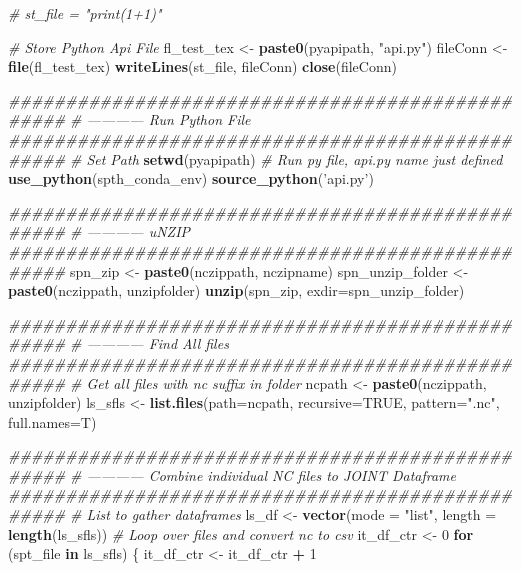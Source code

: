\documentclass[
]{book}
\newenvironment{Shaded}{\begin{snugshade}}{\end{snugshade}}
\newcommand{\CommentTok}[1]{\textcolor[rgb]{0.56,0.35,0.01}{\textit{#1}}}
\newcommand{\ControlFlowTok}[1]{\textcolor[rgb]{0.13,0.29,0.53}{\textbf{#1}}}
\newcommand{\DataTypeTok}[1]{\textcolor[rgb]{0.13,0.29,0.53}{#1}}
\newcommand{\DecValTok}[1]{\textcolor[rgb]{0.00,0.00,0.81}{#1}}
\newcommand{\KeywordTok}[1]{\textcolor[rgb]{0.13,0.29,0.53}{\textbf{#1}}}
\newcommand{\NormalTok}[1]{#1}
\newcommand{\OperatorTok}[1]{\textcolor[rgb]{0.81,0.36,0.00}{\textbf{#1}}}
\newcommand{\OtherTok}[1]{\textcolor[rgb]{0.56,0.35,0.01}{#1}}
\newcommand{\StringTok}[1]{\textcolor[rgb]{0.31,0.60,0.02}{#1}}
\begin{document}
\begin{Shaded}
\begin{Highlighting}[]
    \CommentTok{# st_file = "print(1+1)"}

    \CommentTok{# Store Python Api File}
\NormalTok{    fl_test_tex <-}\StringTok{ }\KeywordTok{paste0}\NormalTok{(pyapipath, }\StringTok{"api.py"}\NormalTok{)}
\NormalTok{    fileConn <-}\StringTok{ }\KeywordTok{file}\NormalTok{(fl_test_tex)}
    \KeywordTok{writeLines}\NormalTok{(st_file, fileConn)}
    \KeywordTok{close}\NormalTok{(fileConn)}

    \CommentTok{#################################################}
    \CommentTok{# ------------ Run Python File}
    \CommentTok{#################################################}
    \CommentTok{# Set Path}
    \KeywordTok{setwd}\NormalTok{(pyapipath)}
    \CommentTok{# Run py file, api.py name just defined}
    \KeywordTok{use_python}\NormalTok{(spth_conda_env)}
    \KeywordTok{source_python}\NormalTok{(}\StringTok{'api.py'}\NormalTok{)}

    \CommentTok{#################################################}
    \CommentTok{# ------------ uNZIP}
    \CommentTok{#################################################}
\NormalTok{    spn_zip <-}\StringTok{ }\KeywordTok{paste0}\NormalTok{(nczippath, nczipname)}
\NormalTok{    spn_unzip_folder <-}\StringTok{ }\KeywordTok{paste0}\NormalTok{(nczippath, unzipfolder)}
    \KeywordTok{unzip}\NormalTok{(spn_zip, }\DataTypeTok{exdir=}\NormalTok{spn_unzip_folder)}

    \CommentTok{#################################################}
    \CommentTok{# ------------ Find All files}
    \CommentTok{#################################################}
    \CommentTok{# Get all files with nc suffix in folder}
\NormalTok{    ncpath <-}\StringTok{ }\KeywordTok{paste0}\NormalTok{(nczippath, unzipfolder)}
\NormalTok{    ls_sfls <-}\StringTok{ }\KeywordTok{list.files}\NormalTok{(}\DataTypeTok{path=}\NormalTok{ncpath, }\DataTypeTok{recursive=}\OtherTok{TRUE}\NormalTok{, }\DataTypeTok{pattern=}\StringTok{".nc"}\NormalTok{, }\DataTypeTok{full.names=}\NormalTok{T)}

    \CommentTok{#################################################}
    \CommentTok{# ------------ Combine individual NC files to JOINT Dataframe}
    \CommentTok{#################################################}
    \CommentTok{# List to gather dataframes}
\NormalTok{    ls_df <-}\StringTok{ }\KeywordTok{vector}\NormalTok{(}\DataTypeTok{mode =} \StringTok{"list"}\NormalTok{, }\DataTypeTok{length =} \KeywordTok{length}\NormalTok{(ls_sfls))}
    \CommentTok{# Loop over files and convert nc to csv}
\NormalTok{    it_df_ctr <-}\StringTok{ }\DecValTok{0}
    \ControlFlowTok{for}\NormalTok{ (spt_file }\ControlFlowTok{in}\NormalTok{ ls_sfls) \{}
\NormalTok{      it_df_ctr <-}\StringTok{ }\NormalTok{it_df_ctr }\OperatorTok{+}\StringTok{ }\DecValTok{1}


\end{Highlighting}
\end{Shaded}
\end{document}
